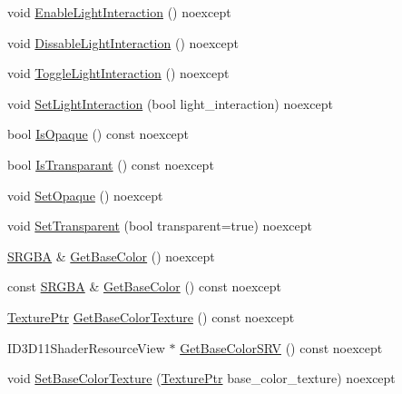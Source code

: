 \begin{DoxyCompactItemize}
\item 
void \hyperlink{classmage_1_1rendering_1_1_material_a6cacaf988bf34a619c701d6fcd693322}{Enable\+Light\+Interaction} () noexcept
\item 
void \hyperlink{classmage_1_1rendering_1_1_material_a9b515c8968a5db43746fed088d67a514}{Dissable\+Light\+Interaction} () noexcept
\item 
void \hyperlink{classmage_1_1rendering_1_1_material_a70db3a2d474a3545e573cb9fdfa11347}{Toggle\+Light\+Interaction} () noexcept
\item 
void \hyperlink{classmage_1_1rendering_1_1_material_a151a2170aa88811ea6fb1537ce68803d}{Set\+Light\+Interaction} (bool light\+\_\+interaction) noexcept
\item 
bool \hyperlink{classmage_1_1rendering_1_1_material_af750917e67bdaf7e47129617102887ab}{Is\+Opaque} () const noexcept
\item 
bool \hyperlink{classmage_1_1rendering_1_1_material_ae60d1b61ebd38d3e329a519b2f2c3dad}{Is\+Transparant} () const noexcept
\item 
void \hyperlink{classmage_1_1rendering_1_1_material_a23741c39e6ad9a8d12b7793bc3da4131}{Set\+Opaque} () noexcept
\item 
void \hyperlink{classmage_1_1rendering_1_1_material_a8da0e0ed4df1e9ce0c7381d88b6d6c48}{Set\+Transparent} (bool transparent=true) noexcept
\item 
\hyperlink{structmage_1_1_s_r_g_b_a}{S\+R\+G\+BA} \& \hyperlink{classmage_1_1rendering_1_1_material_a3b5c99673752acd11758cc0ebab3f68a}{Get\+Base\+Color} () noexcept
\item 
const \hyperlink{structmage_1_1_s_r_g_b_a}{S\+R\+G\+BA} \& \hyperlink{classmage_1_1rendering_1_1_material_a600b48c0711a4b72813a18619b039e07}{Get\+Base\+Color} () const noexcept
\item 
\hyperlink{namespacemage_1_1rendering_a6f3ae54f825328465b0cdde0f0de4a36}{Texture\+Ptr} \hyperlink{classmage_1_1rendering_1_1_material_ac9ce1aff5b5e3d34ae83eb194786cebe}{Get\+Base\+Color\+Texture} () const noexcept
\item 
I\+D3\+D11\+Shader\+Resource\+View $\ast$ \hyperlink{classmage_1_1rendering_1_1_material_a363d85135b18e4e8c8a0b1d2fd88a435}{Get\+Base\+Color\+S\+RV} () const noexcept
\item 
void \hyperlink{classmage_1_1rendering_1_1_material_aae6ebdb492e06a39e1f420154962ab0f}{Set\+Base\+Color\+Texture} (\hyperlink{namespacemage_1_1rendering_a6f3ae54f825328465b0cdde0f0de4a36}{Texture\+Ptr} base\+\_\+color\+\_\+texture) noexcept
\item 

\end{DoxyCompactItemize}
